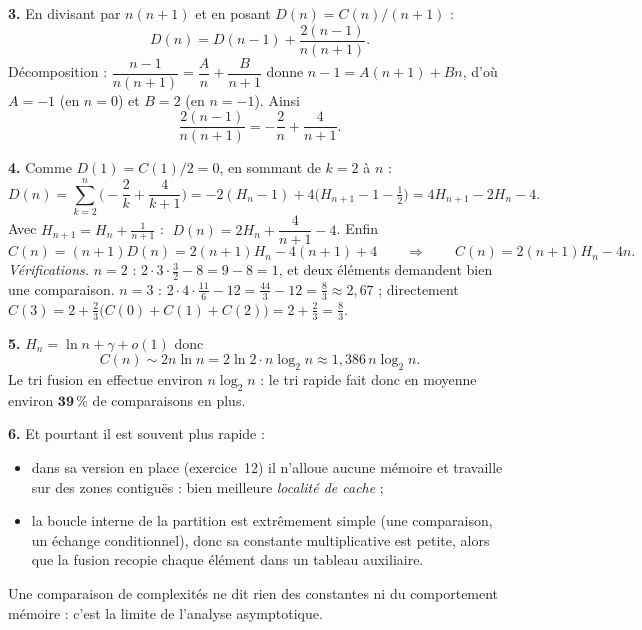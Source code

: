 \documentclass[11pt,a4paper]{article}
\begin{document}
\textbf{3.} En divisant par $n(n+1)$ et en posant $D(n)=C(n)/(n+1)$ :
\[
  D(n)=D(n-1)+\frac{2(n-1)}{n(n+1)} .
\]
Décomposition : $\dfrac{n-1}{n(n+1)}=\dfrac{A}{n}+\dfrac{B}{n+1}$ donne
$n-1=A(n+1)+Bn$, d'où $A=-1$ (en $n=0$) et $B=2$ (en $n=-1$). Ainsi
\[
  \frac{2(n-1)}{n(n+1)} = -\frac2n+\frac{4}{n+1}.
\]

\textbf{4.} Comme $D(1)=C(1)/2=0$, en sommant de $k=2$ à $n$ :
\[
  D(n)=\sum_{k=2}^{n}\Big(-\frac2k+\frac4{k+1}\Big)
      = -2(H_n-1) + 4\Big(H_{n+1}-1-\tfrac12\Big)
      = 4H_{n+1}-2H_n-4 .
\]
Avec $H_{n+1}=H_n+\frac1{n+1}$ :
$\;D(n)=2H_n+\dfrac4{n+1}-4$. Enfin
\[
  C(n)=(n+1)D(n) = 2(n+1)H_n - 4(n+1) + 4
  \qquad\Longrightarrow\qquad \boxed{C(n)=2(n+1)H_n-4n}.
\]
\emph{Vérifications.} $n=2$ : $2\cdot3\cdot\frac32-8=9-8=1$, et deux éléments demandent
bien une comparaison. \checkmark
$n=3$ : $2\cdot4\cdot\frac{11}{6}-12=\frac{44}{3}-12=\frac83\approx2{,}67$ ;
directement $C(3)=2+\frac23\big(C(0)+C(1)+C(2)\big)=2+\frac23=\frac83$. \checkmark

\textbf{5.} $H_n=\ln n+\gamma+o(1)$ donc
\[
  C(n)\sim 2n\ln n = 2\ln 2\cdot n\log_2 n \approx 1{,}386\,n\log_2 n .
\]
Le tri fusion en effectue environ $n\log_2 n$ : le tri rapide fait donc en moyenne
environ $\mathbf{39\,\%}$ de comparaisons en plus.

\textbf{6.} Et pourtant il est souvent plus rapide :
\begin{itemize}[leftmargin=*,itemsep=1pt]
  \item dans sa version en place (exercice~12) il n'alloue aucune mémoire et travaille
        sur des zones contiguës : bien meilleure \emph{localité de cache} ;
  \item la boucle interne de la partition est extrêmement simple (une comparaison, un
        échange conditionnel), donc sa constante multiplicative est petite, alors que la
        fusion recopie chaque élément dans un tableau auxiliaire.
\end{itemize}
Une comparaison de complexités ne dit rien des constantes ni du comportement mémoire :
c'est la limite de l'analyse asymptotique.
\end{document}
